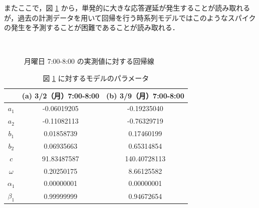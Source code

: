 \documentclass[technicalreport]{ieicej}
\begin{document}
またここで，図 \ref{norm-reg} から，単発的に大きな応答遅延が発生することが読み取れるが，過去の計測データを用いて回帰を行う時系列モデルではこのようなスパイクの発生を予測することが困難であることが読み取れる．

\begin{figure}[tb]
\begin{center}
~
~
\caption{月曜日 7:00-8:00 の実測値に対する回帰線}
\label{norm-reg}
\end{center}
\end{figure}

\begin{table}[tb]
\centering
\caption{図 \ref{norm-reg} に対するモデルのパラメータ}
\label{norm-param}
\begin{tabular}{|c|c|c|}
\hline
&(a) 3/2（月）7:00-8:00&(b) 3/9（月）7:00-8:00\\
\hline
$a_1$&-0.06019205&-0.19235040\\
\hline
$a_2$&-0.11082113&-0.76329719\\
\hline
$b_1$&0.01858739&0.17460199\\
\hline
$b_2$&0.06935663&0.65314854\\
\hline
$c$&91.83487587&140.40728113\\
\hline
$\omega$&0.20250175&8.66125582\\
\hline
$\alpha_1$&0.00000001&0.00000001\\
\hline
$\beta_1$&0.99999999&0.94672654\\
\hline
\end{tabular}
\end{table}
\end{document}
